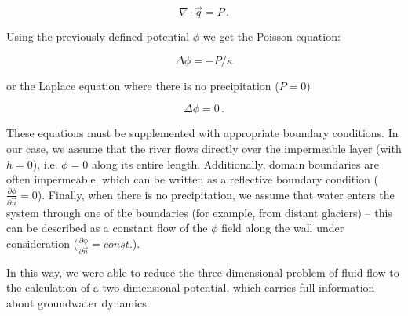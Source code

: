 \documentclass[]{pracamgr}
\begin{document}
      \begin{equation}
    		\nabla \cdot \vec{q} = P \,.
    	\end{equation}
      
      Using the previously defined potential $\phi$ we get the Poisson equation:
      
      \begin{equation}
        \label{poisson}
    		\Delta \phi = -P/\kappa
    	\end{equation}
      
      or the Laplace equation where there is no precipitation ($P=0$)
      
      \begin{equation}
        \label{laplace}
    		\Delta \phi = 0 \,.
    	\end{equation}	

      These equations must be supplemented with appropriate boundary conditions. In our case, we assume that the river flows directly over the impermeable layer (with $h = 0$), i.e. $\phi = 0$ along its entire length. Additionally, domain boundaries are often impermeable, which can be written as a reflective boundary condition ($\frac{\partial \phi}{\partial \vec{n}} = 0$). Finally, when there is no precipitation, we assume that water enters the system through one of the boundaries (for example, from distant glaciers) -- this can be described as a constant flow of the $\phi$ field along the wall under consideration ($\frac{\partial \phi }{\partial \vec{n}} = const.$).
      
      In this way, we were able to reduce the three-dimensional problem of fluid flow to the calculation of a two-dimensional potential, which carries full information about groundwater dynamics.
\end{document}
